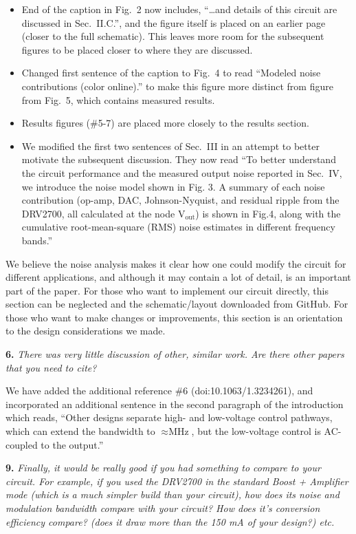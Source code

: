 \documentclass[12pt, oneside]{letter}   	%
\begin{document}
\begin{itemize}
\item End of the caption in Fig.~2 now includes, ``\ldots and details of this circuit are discussed in Sec.~II.C.'', and the figure itself is placed on an earlier page (closer to the full schematic). This leaves more room for the subsequent figures to be placed closer to where they are discussed.
\item Changed first sentence of the caption to Fig.~4 to read ``Modeled noise contributions (color online).'' to make this figure more distinct from figure from Fig.~5, which contains measured results.
\item Results figures (\#5-7) are placed more closely to the results section.
\item We modified the first two sentences of Sec.~III in an attempt to better motivate the subsequent discussion. They now read ``To better understand the circuit performance and the measured output noise reported in Sec.~IV, we introduce the noise model shown in Fig. 3. A summary of each noise contribution (op-amp, DAC, Johnson-Nyquist, and residual ripple from the DRV2700, all calculated at the node $\text{V}_\text{out}$) is shown in Fig.4, along with the cumulative root-mean-square (RMS) noise estimates in different frequency bands.''
\end{itemize}

We believe the noise analysis makes it clear how one could modify the circuit for different applications, and although it may contain a lot of detail, is an important part of the paper.
For those who want to implement our circuit directly, this section can be neglected and the schematic/layout downloaded from GitHub.
For those who want to make changes or improvements, this section is an orientation to the design considerations we made.

\textbf{6.}
\textit{There was very little discussion of other, similar work. Are there other papers that you need to cite?}

We have added the additional reference \#6 (doi:10.1063/1.3234261), and incorporated an additional sentence in the second paragraph of the introduction which reads, ``Other designs separate high- and low-voltage control pathways, which can extend the bandwidth to $\approx\si{\mega\hertz}$, but the low-voltage control is AC-coupled to the output.''

\textbf{9.}
\textit{Finally, it would be really good if you had something to compare to your circuit. For example, if you used the DRV2700 in the standard Boost + Amplifier mode (which is a much simpler build than your circuit), how does its noise and modulation bandwidth compare with your circuit? How does it's conversion efficiency compare? (does it draw more than the 150 mA of your design?) etc. }
\end{document}
